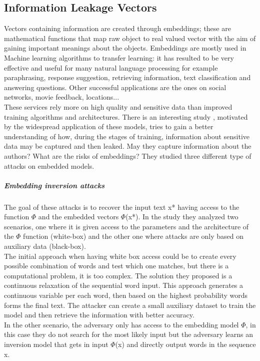 \subsection{Information Leakage Vectors}\label{subsection:InfoLeakageVectors}
Vectors containing information are created through embeddings; these are mathematical functions that map raw object to real valued vector with the aim of gaining important meanings about the objects. 
Embeddings are mostly used in Machine learning algorithms to transfer learning: it has resulted to be very effective and useful for many natural language processing for example paraphrasing, response suggestion, retrieving information, text classification and answering questions. 
Other successful applications are the ones on social networks, movie feedback, locations... 
\\These services rely more on high quality and sensitive data than improved training algorithms and architectures. 
There is an interesting study \cite{embeddingModels}, motivated by the widespread application of these models, tries to gain a better understanding of how, during the stages of training, information about sensitive data may be captured and then leaked.
May they capture information about the authors? What are the risks of embeddings?
They studied three different type of attacks on embedded models. 
\subparagraph{Embedding inversion attacks} The goal of these attacks is to recover the input text x* having access to the function $\Phi$ and the embedded vectors $\Phi$(x*).
In the study they analyzed two scenarios, one where it is given access to the parameters and the architecture of the $\Phi$ function (white-box) and the other one where attacks are only based on auxiliary data (black-box).
\\The initial approach when having white box access could be to create every possible combination of words and test which one matches, but there is a computational problem, it is too complex. 
The solution they proposed is a continuous relaxation of the sequential word input. This approach generates a continuous variable per each word, then based on the highest probability words forms the final text.
The attacker can create a small auxiliary dataset to train the model and then retrieve the information with better accuracy.
\\In the other scenario, the adversary only has access to the embedding model $\Phi$, in this case they do not search for the most likely input but the adversary learns an inversion model that gets in input $\Phi$(x) and directly output words in the sequence x. 
